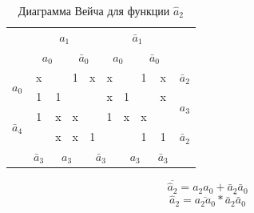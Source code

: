 \documentclass[a4paper,14pt]{article}
\begin{document}
\begin{table}[H]
				\begin{center}
		\caption{\label{tab:a2_preobr} Диаграмма Вейча для функции $\hat{a}_2$}

		\begin{tabular}{cccccccccc}
			& \multicolumn{4}{c}{$a_1$} & \multicolumn{4}{c}{$\bar{a}_1$} &  \\
			& \multicolumn{2}{c}{$a_0$} & \multicolumn{2}{c}{$\bar{a}_0$} & \multicolumn{2}{c}{$a_0$} & \multicolumn{2}{c}{$\bar{a}_0$} &  \\ \cline{2-9}
			\multicolumn{1}{c|}{\multirow{2}{*}{$a_0$}} & \multicolumn{1}{c|}{x} & \multicolumn{1}{c|}{} & \multicolumn{1}{c|}{1} & \multicolumn{1}{c|}{x} & \multicolumn{1}{c|}{x} & \multicolumn{1}{c|}{} & \multicolumn{1}{c|}{1} & \multicolumn{1}{c|}{x} & $\bar{a}_2$ \\ \cline{2-9}
			\multicolumn{1}{c|}{} & \multicolumn{1}{c|}{1} & \multicolumn{1}{c|}{1} & \multicolumn{1}{c|}{} & \multicolumn{1}{c|}{} & \multicolumn{1}{c|}{x} & \multicolumn{1}{c|}{1} & \multicolumn{1}{c|}{} & \multicolumn{1}{c|}{x} & \multirow{2}{*}{$a_3$} \\ \cline{2-9}
			\multicolumn{1}{c|}{\multirow{2}{*}{$\bar{a}_4$}} & \multicolumn{1}{c|}{1} & \multicolumn{1}{c|}{x} & \multicolumn{1}{c|}{x} & \multicolumn{1}{c|}{} & \multicolumn{1}{c|}{1} & \multicolumn{1}{c|}{x} & \multicolumn{1}{c|}{x} & \multicolumn{1}{c|}{} &  \\ \cline{2-9}
			\multicolumn{1}{c|}{} & \multicolumn{1}{c|}{} & \multicolumn{1}{c|}{x} & \multicolumn{1}{c|}{x} & \multicolumn{1}{c|}{1} & \multicolumn{1}{c|}{} & \multicolumn{1}{c|}{} & \multicolumn{1}{c|}{1} & \multicolumn{1}{c|}{1} & $\bar{a}_2$ \\ \cline{2-9}
			& $\bar{a}_3$ & \multicolumn{2}{c}{$a_3$} & \multicolumn{2}{c}{$\bar{a}_3$} & \multicolumn{2}{c}{$a_3$} & $\bar{a}_3$ & 
		\end{tabular}

\end{center}
\end{table}

$$\overline{\hat{a}_2} = a_2 a_0 + \bar{a}_2\bar{a}_0$$
$$\hat{a}_2 = \overline{a_2 a_0} * \overline{\bar{a}_2\bar{a}_0}$$


\end{document}
